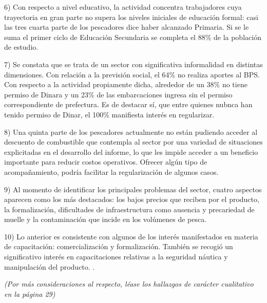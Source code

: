 \documentclass[
  letterpaper,
  DIV=11,
  numbers=noendperiod,
  justified]{scrreprt}
\begin{document}
6) Con respecto a nivel educativo, la actividad concentra trabajadores
cuya trayectoria en gran parte no supera los niveles iniciales de
educación formal: casi las tres cuarta parte de los pescadores dice
haber alcanzado Primaria. Si se le suma el primer ciclo de Educación
Secundaria se completa el 88\% de la población de estudio.

7) Se constata que se trata de un sector con significativa informalidad
en distintas dimensiones. Con relación a la previsión social, el 64\% no
realiza aportes al BPS. Con respecto a la actividad propiamente dicha,
alrededor de un 38\% no tiene permiso de Dinara y un 23\% de las
embarcaciones ingresa sin el permiso correspondiente de prefectura. Es
de destacar sí, que entre quienes nubnca han tenido permiso de Dinar, el
100\% manifiesta interés en regularizar.

8) Una quinta parte de los pescadores actualmente no están pudiendo
acceder al descuento de combustible que contempla al sector por una
variedad de situaciones explicitadas en el desarrollo del informe, lo
que les impide acceder a un beneficio importante para reducir costos
operativos. Ofrecer algún tipo de acompañamiento, podría facilitar la
regularización de algunos casos.

9) Al momento de identificar los principales problemas del sector,
cuatro aspectos aparecen como los más destacados: los bajos precios que
reciben por el producto, la formalización, dificultades de
infraestructura como ausencia y precariedad de muelle y la contaminación
que incide en los volúmenes de pesca.

10) Lo anterior es consistente con algunos de los interés manifestados
en materia de capacitación: comercialización y formalización. También se
recogió un significativo interés en capacitaciones relativas a la
seguridad náutica y manipulación del producto. .

\emph{(Por más consideraciones al respecto, léase los hallazgos de
carácter cualitativo en la página 29)}
\end{document}

